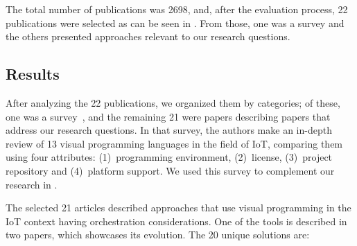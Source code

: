 The total number of publications was 2698, and, after the evaluation process, 22 publications were selected as can be seen in . From those, one was a survey and the others presented approaches relevant to our research questions.

\subsection{Results}\label{sec:slr_results}

After analyzing the 22 publications, we organized them by categories; of these, one was a survey~\cite{survey_vpl_iot}, and the remaining 21 were papers describing papers that address our research questions. In that survey, the authors make an in-depth review of 13 visual programming languages in the field of IoT, comparing them using four attributes: (1)~programming environment, (2)~license, (3)~project repository and (4)~platform support. We used this survey to complement our research in .

The selected 21 articles described approaches that use visual programming in the IoT context having orchestration considerations. One of the tools is described in two papers, which showcases its evolution. The 20 unique solutions are:

